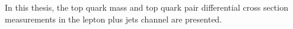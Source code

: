 


\begin{abstracts}        %
In this thesis, the top quark mass and top quark pair differential cross section measurements in the lepton plus jets
channel are presented.
\end{abstracts}




